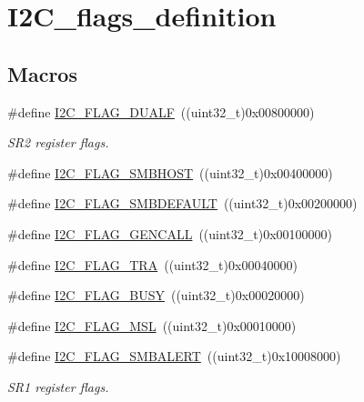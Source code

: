 \hypertarget{group___i2_c__flags__definition}{}\section{I2\+C\+\_\+flags\+\_\+definition}
\label{group___i2_c__flags__definition}
\subsection*{Macros}
\begin{DoxyCompactItemize}
\item 
\#define \mbox{\hyperlink{group___i2_c__flags__definition_ga3755b783aa73568659478c2e2e45e27f}{I2\+C\+\_\+\+F\+L\+A\+G\+\_\+\+D\+U\+A\+LF}}~((uint32\+\_\+t)0x00800000)
\begin{DoxyCompactList}\small\item\em S\+R2 register flags. \end{DoxyCompactList}\item 
\#define \mbox{\hyperlink{group___i2_c__flags__definition_gaf15403a1852f39aaadbb8942ba98d97e}{I2\+C\+\_\+\+F\+L\+A\+G\+\_\+\+S\+M\+B\+H\+O\+ST}}~((uint32\+\_\+t)0x00400000)
\item 
\#define \mbox{\hyperlink{group___i2_c__flags__definition_ga371fb29861d1cd41736253e804c67ad5}{I2\+C\+\_\+\+F\+L\+A\+G\+\_\+\+S\+M\+B\+D\+E\+F\+A\+U\+LT}}~((uint32\+\_\+t)0x00200000)
\item 
\#define \mbox{\hyperlink{group___i2_c__flags__definition_gab3a93b6840ad406c2fc09e0e96c59b88}{I2\+C\+\_\+\+F\+L\+A\+G\+\_\+\+G\+E\+N\+C\+A\+LL}}~((uint32\+\_\+t)0x00100000)
\item 
\#define \mbox{\hyperlink{group___i2_c__flags__definition_ga0359a5f960670d51cb17e659d32498ea}{I2\+C\+\_\+\+F\+L\+A\+G\+\_\+\+T\+RA}}~((uint32\+\_\+t)0x00040000)
\item 
\#define \mbox{\hyperlink{group___i2_c__flags__definition_ga50f69f043d99600221076100823b6ff3}{I2\+C\+\_\+\+F\+L\+A\+G\+\_\+\+B\+U\+SY}}~((uint32\+\_\+t)0x00020000)
\item 
\#define \mbox{\hyperlink{group___i2_c__flags__definition_gae8e6a404cbfd70420d278d520304f368}{I2\+C\+\_\+\+F\+L\+A\+G\+\_\+\+M\+SL}}~((uint32\+\_\+t)0x00010000)
\item 
\#define \mbox{\hyperlink{group___i2_c__flags__definition_ga4e1d7cd1574d03ba501c27483300c1be}{I2\+C\+\_\+\+F\+L\+A\+G\+\_\+\+S\+M\+B\+A\+L\+E\+RT}}~((uint32\+\_\+t)0x10008000)
\begin{DoxyCompactList}\small\item\em S\+R1 register flags. \end{DoxyCompactList}\item 

\end{DoxyCompactItemize}
